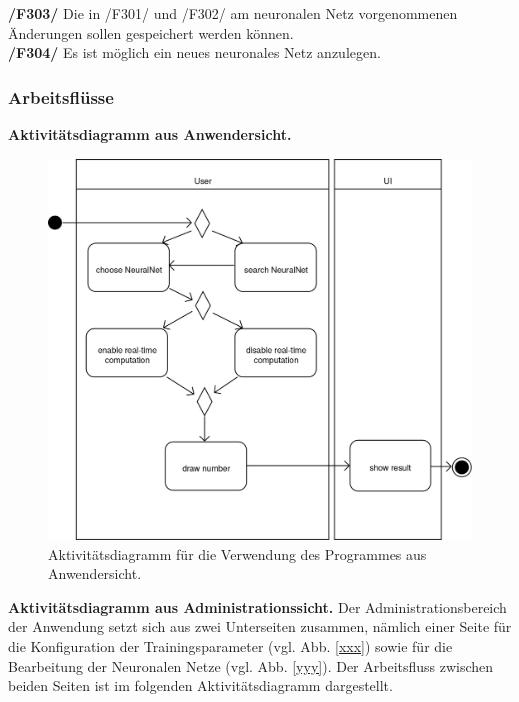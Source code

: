 \textbf{/F303/} Die in /F301/ und /F302/ am neuronalen Netz vorgenommenen Änderungen sollen gespeichert werden können.\\[-0.2cm]

\textbf{/F304/} Es ist möglich ein neues neuronales Netz anzulegen.\\[-0.2cm]


\subsubsection{Arbeitsflüsse}

\textbf{Aktivitätsdiagramm aus Anwendersicht.}

\begin{figure}[H]
\begin{center}
\includegraphics[width=\textwidth]{Abbildungen/UML/uml_ronny/AD_UI.png}
\caption{Aktivitätsdiagramm für die Verwendung des Programmes aus Anwendersicht.}
\label{fig_AD_UI}
\end{center}
\end{figure}

\textbf{Aktivitätsdiagramm aus Administrationssicht.} Der Administrationsbereich der Anwendung setzt sich aus zwei Unterseiten zusammen, nämlich einer Seite für die Konfiguration der Trainingsparameter (vgl. Abb. \ref{xxx}) sowie für die Bearbeitung der Neuronalen Netze (vgl. Abb. \ref{yyy}). Der Arbeitsfluss zwischen beiden Seiten ist im folgenden Aktivitätsdiagramm dargestellt.

